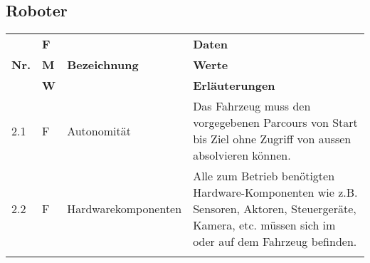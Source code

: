\documentclass[main.tex]{subfiles} %
\begin{document}
\subsection*{Roboter}
\begin{tabular}{|l|p{0.5cm}|p{4cm}|p{10cm}|}
  \hline
               & \textbf{F} &                       & \textbf{Daten}                                                                                                                                                                                                                                                                                                                             \\
  \textbf{Nr.} & \textbf{M} & \textbf{Bezeichnung}  & \textbf{Werte}                                                                                                                                                                                                                                                                                                                             \\
               & \textbf{W} &                       & \textbf{Erläuterungen}                                                                                                                                                                                                                                                                                                                     \\
  \hline
  2.1          & F          & Autonomität           & Das Fahrzeug muss den vorgegebenen Parcours von Start bis Ziel ohne Zugriff von aussen absolvieren können.                                                                                                                                                                                                                                 \\
  \hline
  2.2          & F          & Hardwarekomponenten   & Alle zum Betrieb benötigten Hardware-Komponenten wie z.B. Sensoren, Aktoren, Steuergeräte, Kamera, etc. müssen sich im oder auf dem Fahrzeug befinden.                                                                                                                                                                                     \\                                                                                                                                                                                                                                                                                                                                           \\

\end{tabular}
\end{document}
